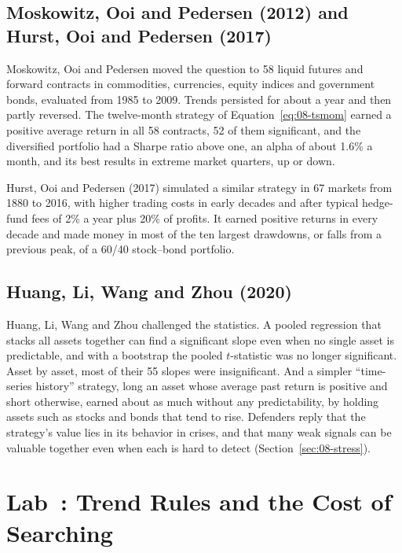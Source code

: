 \subsection{Moskowitz, Ooi and Pedersen (2012) and Hurst, Ooi and Pedersen (2017)}

Moskowitz, Ooi and Pedersen moved the question to 58 liquid futures and forward contracts in commodities, currencies, equity indices and government bonds, evaluated from 1985 to 2009. Trends persisted for about a year and then partly reversed. The twelve-month strategy of Equation~\eqref{eq:08-tsmom} earned a positive average return in all 58 contracts, 52 of them significant, and the diversified portfolio had a Sharpe ratio above one, an alpha of about 1.6\% a month, and its best results in extreme market quarters, up or down.

Hurst, Ooi and Pedersen (2017) simulated a similar strategy in 67 markets from 1880 to 2016, with higher trading costs in early decades and after typical hedge-fund fees of 2\% a year plus 20\% of profits. It earned positive returns in every decade and made money in most of the ten largest drawdowns, or falls from a previous peak, of a 60/40 stock--bond portfolio.

\subsection{Huang, Li, Wang and Zhou (2020)}

Huang, Li, Wang and Zhou challenged the statistics. A pooled regression that stacks all assets together can find a significant slope even when no single asset is predictable, and with a bootstrap the pooled $t$-statistic was no longer significant. Asset by asset, most of their 55 slopes were insignificant. And a simpler ``time-series history'' strategy, long an asset whose average past return is positive and short otherwise, earned about as much without any predictability, by holding assets such as stocks and bonds that tend to rise. Defenders reply that the strategy's value lies in its behavior in crises, and that many weak signals can be valuable together even when each is hard to detect (Section~\ref{sec:08-stress}).

\section{Lab~\thechapter: Trend Rules and the Cost of Searching}
\label{sec:08-lab}

